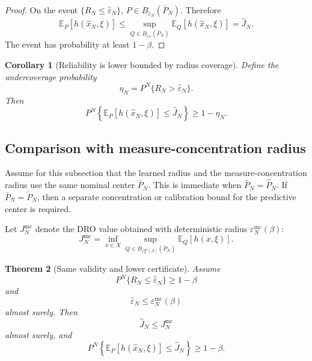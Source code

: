 \documentclass[11pt]{article}
\newtheorem{theorem}{Theorem}[section]
\newtheorem{corollary}[theorem]{Corollary}
\newcommand{\E}{\mathbb{E}}
\newcommand{\1}{\mathbf{1}}
\newcommand{\Phat}{\widehat P_N}
\newcommand{\Ptil}{\widetilde P_N}
\newcommand{\Pbar}{\bar P_N}
\newcommand{\epshat}{\widehat\varepsilon_N}
\newcommand{\epsmc}{\varepsilon_N^{\mathrm{mc}}}
\begin{document}
\begin{proof}
On the event $\{R_N\le\epshat\}$, $P\in B_{\epshat}(\Pbar)$. Therefore
\begin{equation}
\E_P[h(\widehat x_N,\xi)]\le
\sup_{Q\in B_{\epshat}(\Pbar)}\E_Q[h(\widehat x_N,\xi)]
=\widehat J_N.
\end{equation}
The event has probability at least $1-\beta$.
\end{proof}

\begin{corollary}[Reliability is lower bounded by radius coverage]\label{cor:eta}
Define the undercoverage probability
\begin{equation}
    \eta_N=P^N\{R_N>\epshat\}.
\end{equation}
Then
\begin{equation}
    P^N\left\{\E_P[h(\widehat x_N,\xi)]\le\widehat J_N\right\}
    \ge 1-\eta_N.
\end{equation}
\end{corollary}

\subsection{Comparison with measure-concentration radius}

Assume for this subsection that the learned radius and the measure-concentration radius use the same nominal center $\Pbar$. This is immediate when $\Pbar=\Phat$. If $\Pbar=\Ptil$, then a separate concentration or calibration bound for the predictive center is required.

Let $J_N^{\mathrm{mc}}$ denote the DRO value obtained with deterministic radius $\epsmc(\beta)$:
\begin{equation}
    J_N^{\mathrm{mc}}=\inf_{x\in X}\sup_{Q\in B_{\epsmc(\beta)}(\Pbar)}\E_Q[h(x,\xi)].
\end{equation}

\begin{theorem}[Same validity and lower certificate]\label{thm:same-valid-lower-cert}
Assume
\begin{equation}
    P^N\{R_N\le\epshat\}\ge1-\beta
\end{equation}
and
\begin{equation}
    \epshat\le \epsmc(\beta)
\end{equation}
almost surely. Then
\begin{equation}
    \widehat J_N\le J_N^{\mathrm{mc}}
\end{equation}
almost surely, and
\begin{equation}
    P^N\left\{\E_P[h(\widehat x_N,\xi)]\le\widehat J_N\right\}\ge1-\beta.
\end{equation}
\end{theorem}
\end{document}
